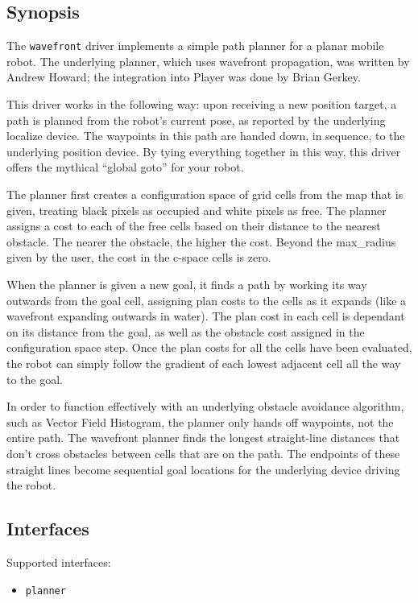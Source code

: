 \subsection*{Synopsis}
The {\tt wavefront} driver implements a simple path planner for a planar
mobile robot.  The underlying planner, which uses wavefront propagation,
was written by Andrew Howard; the integration into Player was done by Brian
Gerkey.

This driver works in the following way: upon receiving a new position
target, a path is planned from the robot's current pose, as reported by
the underlying localize device.  The waypoints in this path are handed
down, in sequence, to the underlying position device. By tying everything together in this way, 
this driver offers the mythical ``global goto'' for your robot.

The planner first creates a configuration space of grid cells from the map that is given, 
treating black pixels as occupied and white pixels as free. The planner assigns a cost to each of the free cells based on
their distance to the nearest obstacle. The nearer the obstacle, the higher the cost. Beyond the 
max\_radius given by the user, the cost in the c-space cells is zero.

When the planner is given a new goal, it finds a path by working its way outwards from the goal cell, assigning plan costs to the cells as it expands (like a wavefront expanding outwards in water). The plan cost in each cell is dependant on its distance from the goal, as well as the obstacle cost assigned in the configuration space step. Once the plan costs for all the cells have been evaluated, the robot can simply follow the gradient of each lowest adjacent cell all the way to the goal.

In order to function effectively with an underlying obstacle avoidance algorithm, such as Vector Field Histogram, the planner only hands off waypoints, not the entire path. The wavefront planner finds the longest straight-line distances that don't cross obstacles between cells that are on the path. The endpoints of these straight lines become sequential goal locations for the underlying device driving the robot. 

\subsection*{Interfaces}

\noindent Supported interfaces:

\begin{itemize}
\item {\tt planner}
\end{itemize}

